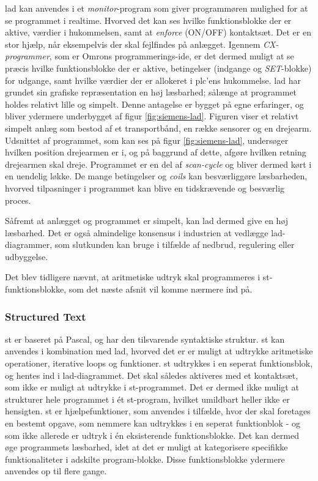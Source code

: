 \noindent \gls{lad} kan anvendes i et \textit{monitor}-program som giver programmøren mulighed for at se programmet i realtime. Hvorved det kan ses hvilke funktionsblokke der er aktive, værdier i hukommelsen, samt at \textit{enforce} (ON/OFF) kontaktsæt. Det er en stor hjælp, når eksempelvis der skal fejlfindes på anlægget. Igennem \textit{CX-programmer}, som er Omrons programmerings-\gls{ide}, er det dermed muligt at se præcis hvilke funktionsblokke der er aktive, betingelser (indgange og \textit{SET}-blokke) for udgange, samt hvilke værdier der er allokeret i \gls{plc}'ens hukommelse. \gls{lad} har grundet sin grafiske repræsentation en høj læsbarhed; sålænge at programmet holdes relativt lille og simpelt. Denne antagelse er bygget på egne erfaringer, og bliver ydermere underbygget af figur \ref{fig:siemens-lad}. Figuren viser et relativt simpelt anlæg som bestod af et transportbånd, en række sensorer og en drejearm. Udsnittet af programmet, som kan ses på figur \ref{fig:siemens-lad}, undersøger hvilken position drejearmen er i, og på baggrund af dette, afgøre hvilken retning drejearmen skal dreje. Programmet er en del af \textit{scan-cycle} og bliver dermed kørt i en uendelig løkke. De mange betingelser og \textit{coils} kan besværliggøre læsbarheden, hvorved tilpasninger i programmet kan blive en tidskrævende og besværlig proces.


\noindent Såfremt at anlægget og programmet er simpelt, kan \gls{lad} dermed give en høj læsbarhed. Det er også almindelige konsensus i industrien at vedlægge \gls{lad}-diagrammer, som slutkunden kan bruge i tilfælde af nedbrud, regulering eller udbyggelse. \cite{FDB_desc}

Det blev tidligere nævnt, at aritmetiske udtryk skal programmeres i \gls{st}-funktionsblokke, som det næste afsnit vil komme nærmere ind på. 

\subsubsection{Structured Text}
\gls{st} er baseret på Pascal, og har den tilsvarende syntaktiske struktur. \gls{st} kan anvendes i kombination med \gls{lad}, hvorved det er er muligt at udtrykke aritmetiske operationer, iterative loops og funktioner. \gls{st} udtrykkes i en seperat funktionsblok, og hentes ind i \gls{lad}-diagrammet. Det skal således aktiveres med et kontaktsæt, som ikke er muligt at udtrykke i \gls{st}-programmet. Det er dermed ikke muligt at strukturer hele programmet i ét \gls{st}-program, hvilket umildbart heller ikke er hensigten. \gls{st} er hjælpefunktioner, som anvendes i tilfælde, hvor der skal foretages en bestemt opgave, som nemmere kan udtrykkes i en seperat funktionblok - og som ikke allerede er udtryk i én eksisterende funktionsblokke. Det kan dermed øge programmets læsbarhed, idet at det er muligt at kategorisere specifikke funktionaliteter i adskilte program-blokke. Disse funktionsblokke ydermere anvendes op til flere gange. 

